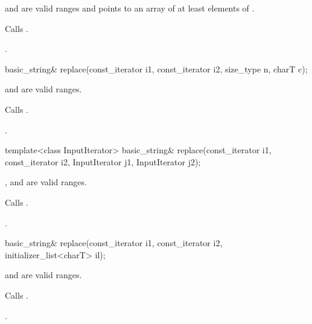 \begin{itemdescr}
\pnum
\requires {} and  are valid ranges and
 points to an array of at least 
elements of .

\pnum
\effects Calls .

\pnum
\returns
{}.
\end{itemdescr}

%
\begin{itemdecl}
basic_string& replace(const_iterator i1, const_iterator i2, size_type n, charT c);
\end{itemdecl}

\begin{itemdescr}
\pnum
\requires {} and  are valid ranges.

\pnum
\effects Calls .

\pnum
\returns
{}.
\end{itemdescr}

%
\begin{itemdecl}
template<class InputIterator>
  basic_string& replace(const_iterator i1, const_iterator i2, InputIterator j1, InputIterator j2);
\end{itemdecl}

\begin{itemdescr}
\pnum
\requires {},  and  are valid ranges.

\pnum
\effects Calls .

\pnum
\returns
{}.
\end{itemdescr}

%
\begin{itemdecl}
basic_string& replace(const_iterator i1, const_iterator i2, initializer_list<charT> il);
\end{itemdecl}

\begin{itemdescr}
\pnum
\requires {} and  are valid ranges.

\pnum
\effects Calls .

\pnum
\returns
{}.
\end{itemdescr}


